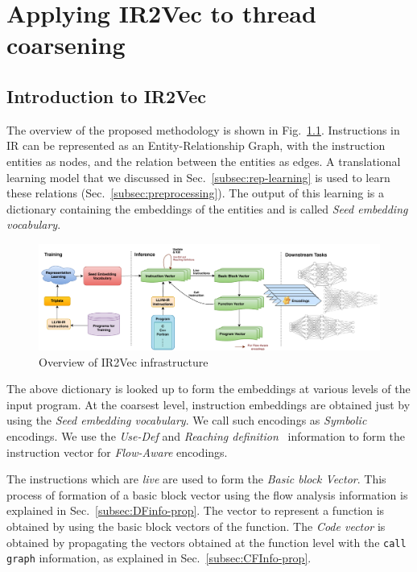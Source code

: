\chapter{Applying IR2Vec to thread coarsening}
\label{chap:ch2}


\section{Introduction to IR2Vec}
The overview of the proposed methodology is shown in Fig.~\ref{fig:IR2Vec-Overview}. Instructions in IR can be represented as an Entity-Relationship Graph, with the instruction entities as nodes, and the relation between the entities as edges. A translational learning model that we discussed in Sec.~\ref{subsec:rep-learning} is used to learn these relations (Sec.~\ref{subsec:preprocessing}). The output of this learning is a dictionary containing the embeddings of the entities and is called \textit{Seed embedding vocabulary}. 

\begin{figure}[t]
    \centering
    \includegraphics[scale=0.5]{figures/flow.pdf}
    \caption{Overview of IR2Vec infrastructure}
     \label{fig:IR2Vec-Overview}
\end{figure}

The above dictionary is looked up to form the embeddings at various levels of the input program. 
At the coarsest level, instruction embeddings are obtained just by using the \textit{Seed embedding vocabulary}. We call such encodings as \textit{Symbolic} encodings.
We use the \textit{Use-Def} and \textit{Reaching definition}~\cite{Hecht:1977:FAC:540175, muchnick1997advanced} information to form the instruction vector for \textit{Flow-Aware} encodings. 

The instructions which are \textit{live} are used to form the \textit{Basic block Vector}. This process of formation of a basic block vector using the flow analysis information is explained in Sec.~\ref{subsec:DFinfo-prop}. The vector to represent a function is obtained by using the basic block vectors of the function. The \textit{Code vector} is obtained by propagating the vectors obtained at the function level with the \texttt{call graph} information, as explained in Sec.~\ref{subsec:CFInfo-prop}.
